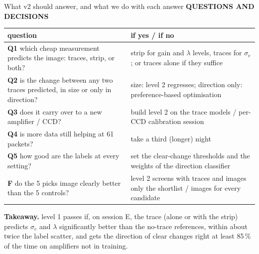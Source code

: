 \documentclass[aspectratio=169,11pt]{beamer}
\newcommand{\eyebrow}[2][trace]{{\color{#1}\scriptsize\bfseries\MakeUppercase{#2}}\par\vspace{0.1em}}
\newcommand{\takeaway}[1]{\par\vspace{0.3em}\colorbox{model!12}{\parbox{0.975\textwidth}{\scriptsize\textbf{Takeaway.} #1}}}
\begin{document}
\begin{frame}{What v2 should answer, and what we do with each answer}
\eyebrow[image]{Questions and decisions}
\scriptsize
\begin{tabular}{p{5.4cm}p{7.2cm}}\toprule
question & if yes / if no\\\midrule
\textbf{Q1} which cheap measurement predicts the image: traces, strip, or both? & strip for gain and $\lambda$ levels, traces for $\sigma_e$; or traces alone if they suffice\\
\textbf{Q2} is the change between any two traces predicted, in size or only in direction? & size: level 2 regresses; direction only: preference-based optimisation\\
\textbf{Q3} does it carry over to a new amplifier / CCD? & build level 2 on the trace models / per-CCD calibration session\\
\textbf{Q4} is more data still helping at 61 packets? & take a third (longer) night\\
\textbf{Q5} how good are the labels at every setting? & set the clear-change thresholds and the weights of the direction classifier\\
\textbf{F} do the 5 picks image clearly better than the 5 controls? & level 2 screens with traces and images only the shortlist / images for every candidate\\\bottomrule
\end{tabular}
\vspace{0.5em}
\takeaway{level 1 passes if, on session E, the trace (alone or with the strip) predicts $\sigma_e$ and $\lambda$ significantly better than the no-trace references, within about twice the label scatter, and gets the direction of clear changes right at least 85\,\% of the time on amplifiers not in training.}
\end{frame}
\end{document}
